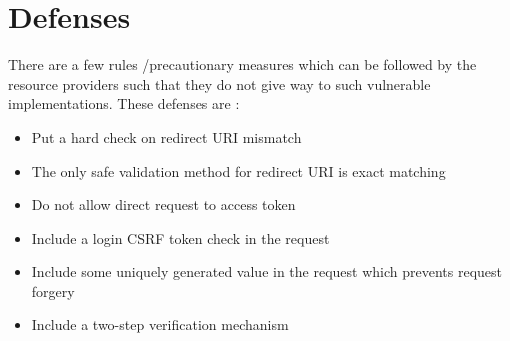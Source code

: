\section{Defenses}
\label{sec:defenses}

There are a few rules /precautionary measures which can be followed by the resource providers such that they do not give way to such vulnerable implementations. These defenses are :

\begin{itemize}
\item Put a hard check on redirect URI mismatch 
\item The only safe validation method for redirect URI is exact matching
\item Do not allow direct request to access token
\item Include a login CSRF token check in the request 
\item Include some uniquely generated value in the request which prevents request forgery
\item Include a two-step verification mechanism
\end{itemize}
